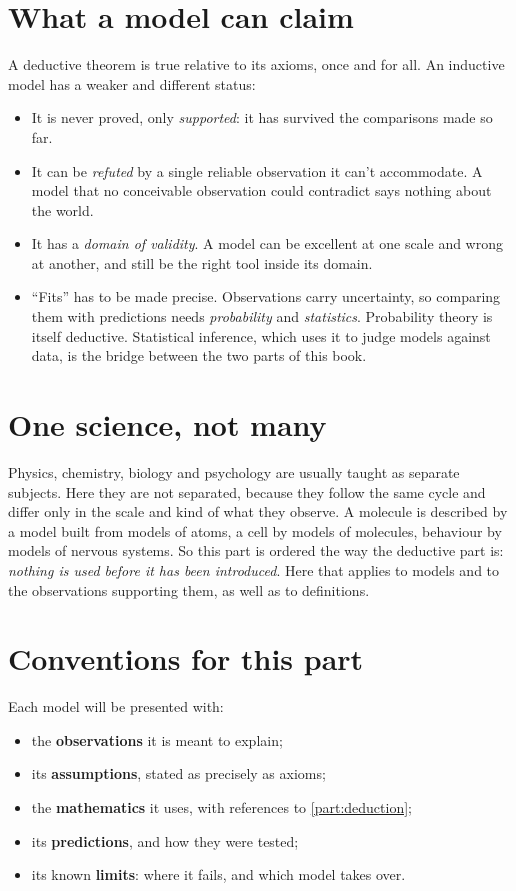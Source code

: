 \section*{What a model can claim}

A deductive theorem is true relative to its axioms, once and for all. An
inductive model has a weaker and different status:
\begin{itemize}
  \item It is never proved, only \emph{supported}: it has survived the comparisons
    made so far.
  \item It can be \emph{refuted} by a single reliable observation it can't
    accommodate. A model that no conceivable observation could contradict says
    nothing about the world.
  \item It has a \emph{domain of validity}. A model can be excellent at one scale
    and wrong at another, and still be the right tool inside its domain.
  \item \enquote{Fits} has to be made precise. Observations carry uncertainty, so
    comparing them with predictions needs \emph{probability} and
    \emph{statistics}. Probability theory is itself deductive. Statistical
    inference, which uses it to judge models against data, is the bridge between
    the two parts of this book.
\end{itemize}

\section*{One science, not many}

Physics, chemistry, biology and psychology are usually taught as separate
subjects. Here they are not separated, because they follow the same cycle and
differ only in the scale and kind of what they observe. A molecule is described
by a model built from models of atoms, a cell by models of molecules, behaviour by
models of nervous systems. So this part is ordered the way the deductive part is:
\emph{nothing is used before it has been introduced}. Here that applies to models
and to the observations supporting them, as well as to definitions.

\section*{Conventions for this part}

Each model will be presented with:
\begin{itemize}
  \item the \textbf{observations} it is meant to explain;
  \item its \textbf{assumptions}, stated as precisely as axioms;
  \item the \textbf{mathematics} it uses, with references to \cref{part:deduction};
  \item its \textbf{predictions}, and how they were tested;
  \item its known \textbf{limits}: where it fails, and which model takes over.
\end{itemize}

